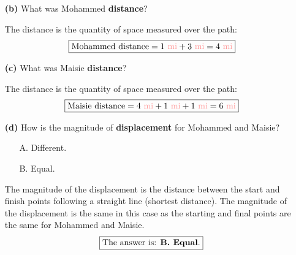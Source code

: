 \documentclass[A4,12pt]{article}
\begin{document}
\begin{enumerate}[label=\bfseries (\arabic*)]
\begin{itemize}
\begin{example}
\end{example}
%
\item[\bf (b)] What was Mohammed \textbf{distance}?
%
\begin{example}
The distance is the quantity of space measured over the path:
\begin{equation*}
    \boxed{\text{Mohammed distance}= \mile{1}+\mile{3}=\mile{4}}
\end{equation*}
\end{example}
%
\item[\bf (c)] What was Maisie \textbf{distance}?
%
\begin{example}
The distance is the quantity of space measured over the path:
\begin{equation*}
    \boxed{\text{Maisie distance}= \mile{4}+\mile{1}+\mile{1}=\mile{6}}
\end{equation*}
\end{example}
%
\item[\bf (d)] How is the magnitude of \textbf{displacement} for Mohammed and Maisie?
\begin{itemize}
    \item[A.] Different.
    \item[B.] Equal.
\end{itemize}
%
\begin{example}
The magnitude of the displacement is the distance between the start and finish points following a straight line (shortest distance). The magnitude of the displacement is the same in this case as the starting and final points are the same for Mohammed and Maisie.
\begin{equation*}
    \boxed{\text{The answer is: \textbf{B. Equal}.}}
\end{equation*}
\end{example}
%

\end{itemize}


















\end{enumerate}
\end{document}
